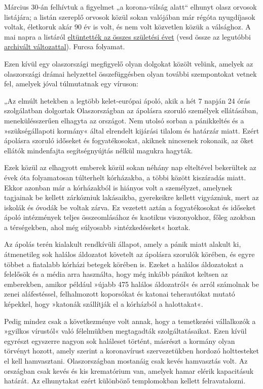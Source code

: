 Március 30-án felhívtuk a figyelmet „a korona-válság alatt`` elhunyt
olasz orvosok listájára; a listán szereplő orvosok közül sokan valójában
már régóta nyugdíjasok voltak, életkoruk akár 90 év is volt, és nem volt
közvetlen közük a válsághoz. A mai napra a listáról
\href{https://portale.fnomceo.it/elenco-dei-medici-caduti-nel-corso-dellepidemia-di-covid-19/}{eltüntették
az összes születési évet} (vesd össze az legutóbbi
\href{https://web.archive.org/web/20200328152430/https://portale.fnomceo.it/elenco-dei-medici-caduti-nel-corso-dellepidemia-di-covid-19/}{archivált
változattal}). Furcsa folyamat.

Ezen kívül egy olaszországi megfigyelő olyan dolgokat közölt velünk,
amelyek az olaszországi drámai helyzettel összefüggésben olyan további
szempontokat vetnek fel, amelyek jóval túlmutatnak egy víruson:

„Az elmúlt hetekben a legtöbb kelet-európai ápoló, akik a hét 7 napján
24 órás szolgálatban dolgoztak Olaszországban az ápolásra szoruló
személyek ellátásában, menekülésszerűen elhagyta az országot. Nem utolsó
sorban a pánikkeltés és a »szükségállapoti kormány« által elrendelt
kijárási tilalom és határzár miatt. Ezért ápolásra szoruló időseket és
fogyatékosokat, akiknek nincsenek rokonaik, az őket ellátók mindenfajta
segítségnyújtás nélkül magukra hagyták.

Ezek közül az elhagyott emberek közül sokan néhány nap elteltével
bekerültek az évek óta folyamatosan túlterhelt kórházakba, a többi
között kiszáradás miatt. Ekkor azonban már a kórházakból is hiányos volt
a személyzet, amelynek tagjainak be kellett zárkózniuk lakásaikba,
gyerekeikre kellett vigyázniuk, mert az iskolák és óvodák be voltak
zárva. Ez vezetett aztán a fogyatékosokat és időseket ápoló intézmények
teljes összeomlásához és kaotikus viszonyokhoz, főleg azokban a
térségekben, ahol még súlyosabb »intézkedéseket« hoztak.

Az ápolás terén kialakult rendkívüli állapot, amely a pánik miatt
alakult ki, átmenetileg sok halálos áldozatot követelt az ápolásra
szorulók körében, és egyre többet a fiatalabb kórházi betegek körében
is. Ezeket a halálos áldozatokat a felelősök és a média arra használta,
hogy még inkább pánikot keltsen az emberekben, amikor például »újabb 475
halálos áldozatról« és arról számolnak be zenei aláfestéssel,
felhalmozott koporsókat és katonai teherautókat mutató képekkel, hogy
»katonák szállítják el a kórházból a halottakat«.

Pedig mindez csak a következménye volt annak, hogy a temetkezési
vállalkozók a »gyilkos vírustól« való félelmükben megtagadták
szolgáltatásaikat. Ezen kívül egyrészt egyszerre nagyon sok haláleset
történt, másrészt a kormány olyan törvényt hozott, amely szerint a
koronavírust szervezetükben hordozó holttesteket el kell hamvasztani.
Olaszországban mostanáig csak kevés hamvasztás volt. Az országban csak
kevés és kis krematórium van, amelyek hamar elérik kapacitásuk határát.
Az elhunytakat ezért különböző templomokban kellett felravatalozni.

